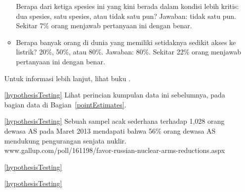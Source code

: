 \begin{itemize}
\begin{itemize}
        Berapa dari ketiga spesies ini yang kini berada dalam
        kondisi lebih kritis:
        dua spesies,
        satu spesies,
        atau tidak satu pun?
        Jawaban: tidak satu pun.
        Sekitar 7\% orang menjawab pertanyaan ini dengan benar.
    \item
        Berapa banyak orang di dunia yang memiliki setidaknya
        sedikit akses ke listrik? 20\%, 50\%, atau 80\%.
        Jawaban: 80\%.
        Sekitar 22\% orang menjawab pertanyaan ini dengan benar.
    \end{itemize}
    Untuk informasi lebih lanjut, lihat buku
    .
\item[\ref{hypothesisTesting}]
    Lihat perincian kumpulan data ini sebelumnya,
    pada bagian data di Bagian~\ref{pointEstimates}.
\item[\ref{hypothesisTesting}]
    Sebuah sampel acak sederhana terhadap 1,028 orang dewasa AS pada Maret 2013
    mendapati bahwa 56\% orang dewasa AS mendukung
    pengurangan senjata nuklir. \\
        {www.gallup.com/poll/161198/favor-russian-nuclear-arms-reductions.aspx}
\item[\ref{hypothesisTesting}]
    \madeup{}
\item[\ref{hypothesisTesting}]
\end{itemize}





\D{\newpage}

\section{}
\label{ch_inference_for_props_data}

